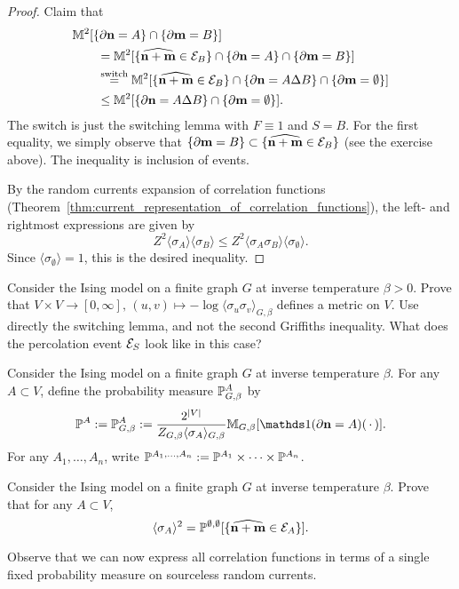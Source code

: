 \begin{proof}
    Claim that
    \begin{align}
        &\M^2[\{\partial\n=A\}\cap\{\partial\m=B\}]
        \\
        &\qquad=
        \M^2[\{\widehat{\n+\m} \in \calE_B\}\cap\{\partial\n=A\}\cap\{\partial\m=B\}]
        \\
        &\qquad\stackrel{\text{switch}}=
        \M^2[\{\widehat{\n+\m} \in \calE_B\}\cap\{\partial\n=A\Delta B\}\cap\{\partial\m=\emptyset\}]
        \\
        &\qquad\leq
        \M^2[\{\partial\n=A\Delta B\}\cap\{\partial\m=\emptyset\}].
    \end{align}
    The switch is just the switching lemma with $F\equiv 1$ and $S=B$.
    For the first equality, we simply observe that $\{\partial\m=B\}\subset \{\widehat{\n+\m} \in \calE_B\}$
    (see the exercise above).
    The inequality is inclusion of events.

    By the random currents expansion of correlation functions (Theorem~\ref{thm:current_representation_of_correlation_functions}),
    the left- and rightmost expressions are given by
    \[
        Z^2\langle\sigma_A\rangle\langle\sigma_B\rangle
        \leq
        Z^2\langle\sigma_A\sigma_B\rangle\langle\sigma_\emptyset\rangle.
    \]
    Since $\langle\sigma_\emptyset\rangle=1$, this is the desired inequality.
\end{proof}

\begin{exercise}
    Consider the Ising model on a finite graph $G$
    at inverse temperature $\beta>0$.
    Prove that $V\times V\to [0,\infty],\,
    (u,v)\mapsto-\log\langle\sigma_u\sigma_v\rangle_{G,\beta}$
    defines a metric on $V$.
    Use directly the switching lemma, and not the second Griffiths inequality.
    What does the percolation event $\calE_S$ look like in this case?
\end{exercise}

\begin{definition}
    Consider the Ising model on a finite graph $G$
    at inverse temperature $\beta$.
    For any $A\subset V$,
    define the probability measure $\P^A_{G,\beta}$ by
    \[
        \P^A:=\P^A_{G,\beta}:=\frac{2^{|V|}}{Z_{G,\beta}\langle\sigma_A\rangle_{G,\beta}}\M_{G,\beta}[\true{\partial\n=A}(\blank)].
    \]
    For any $A_1,\ldots,A_n$,
    write $\P^{A_1,\ldots,A_n}:=\P^{A_1}\times\cdots\times\P^{A_n}$.
\end{definition}

\begin{exercise}
    Consider the Ising model on a finite graph $G$
    at inverse temperature $\beta$.
    Prove that for any $A\subset V$,
    \[
        \langle\sigma_A\rangle^2
        =
        \P^{\emptyset,\emptyset}[\{\widehat{\n+\m}\in\calE_A\}].
    \]

    Observe that we can now express all correlation functions in terms of a single
    fixed probability measure on sourceless random currents.
\end{exercise}
